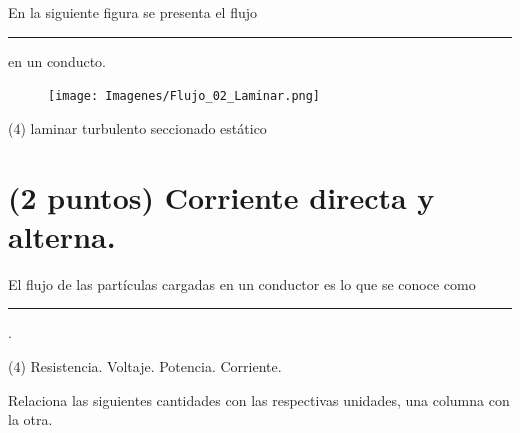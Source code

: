 \documentclass[12pt, letter]{exam}
\begin{document}
\begin{questions}
    \question En la siguiente figura se presenta el flujo \rule{2cm}{0.1mm} en un conducto.
    \begin{figure}[H]
        \centering
        \texttt{[image: Imagenes/Flujo\_02\_Laminar.png]}
    \end{figure}
    \begin{tasks}(4)
        \task laminar
        \task turbulento
        \task seccionado
        \task estático
    \end{tasks}
    
    \section{(2 puntos) Corriente directa y alterna.}

    \question El flujo de las partículas cargadas en un conductor es lo que se conoce como \rule{2cm}{0.1mm}.
    \begin{tasks}(4)
        \task Resistencia.
        \task Voltaje.
        \task Potencia.
        \task Corriente.
    \end{tasks}
    \question Relaciona las siguientes cantidades con las respectivas unidades, una columna con la otra.
    

\end{questions}
\end{document}
